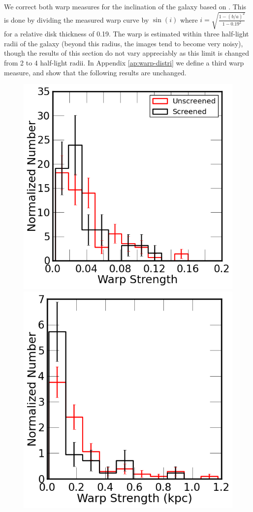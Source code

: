 \documentclass{emulateapj}
\begin{document}
We correct both warp measures
for the inclination of the galaxy based on \citet{geha06}.
This is done by dividing the measured warp curve by $\sin(i)$ where $i =
\sqrt{\frac{1 - (b/a)^2}{1 - 0.19^2}}$ for a relative disk thickness of 0.19.
The warp is estimated within three half-light radii of the galaxy (beyond
this radius, the images tend to become very noisy), though the results of
this section do not vary
appreciably as this limit is changed from 2 to 4 half-light radii.
In Appendix \ref{ap:warp-distri} we define a third warp measure,
and show that the following results are unchanged.

\begin{figure}
\begin{center}
\includegraphics[scale=0.45]{figures/warp-hist-sc-unsc.png}
\includegraphics[scale=0.44]{figures/warp-kpc-hist-sc-unsc.png}

\end{center}
\end{figure}
\end{document}
